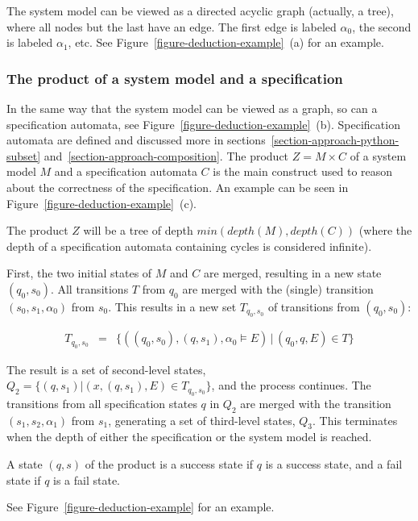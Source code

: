\documentclass[a4paper,11pt]{kth-mag}
\begin{document}
The system model can be viewed as a directed acyclic graph (actually, a tree),
where all nodes but the last have an edge. The first edge is labeled
$\alpha_0$, the second is labeled $\alpha_1$, etc. See
Figure~\ref{figure-deduction-example}~(a) for an example.


\subsubsection{The product of a system model and a specification}

In the same way that the system model can be viewed as a graph, so can a
specification automata, see Figure~\ref{figure-deduction-example}~(b).
Specification automata are defined and discussed more in
sections~\ref{section-approach-python-subset}
and~\ref{section-approach-composition}. The
product $Z = M \times C$ of a system model $M$ and a specification automata $C$
is the main construct used to reason about the correctness of the
specification. An example can be seen in
Figure~\ref{figure-deduction-example}~(c).

The product $Z$ will be a tree of depth $min(depth(M), depth(C))$ (where the
depth of a specification automata containing cycles is considered infinite).

First, the two initial states of $M$ and $C$ are merged, resulting in a new
state $(q_0,s_0)$. All transitions $T$ from $q_0$ are merged with the (single)
transition $(s_0, s_1, \alpha_0)$ from $s_0$. This results in a new set
$T_{q_0,s_0}$ of transitions from $(q_0,s_0)$:

\medskip
\[
  \begin{array}{rcl}
    T_{q_0,s_0} & = & \{((q_0,s_0), (q,s_1), \alpha_0 \models E) \, | \, (q_0, q, E) \in T \}
  \end{array}
\]
\medskip

The result is a set of second-level states, $Q_2 = \{(q,s_1) | (x, (q,s_1),
E) \in T_{q_0,s_0}\}$, and the process continues. The transitions from all
specification states $q$ in $Q_2$ are merged with the transition $(s_1, s_2,
\alpha_1)$ from $s_1$, generating a set of third-level states, $Q_3$. This
terminates when the depth of either the specification or the system model is
reached.

A state $(q, s)$ of the product is a success state if $q$ is a success state,
and a fail state if $q$ is a fail state.

See Figure~\ref{figure-deduction-example} for an example.
\end{document}
